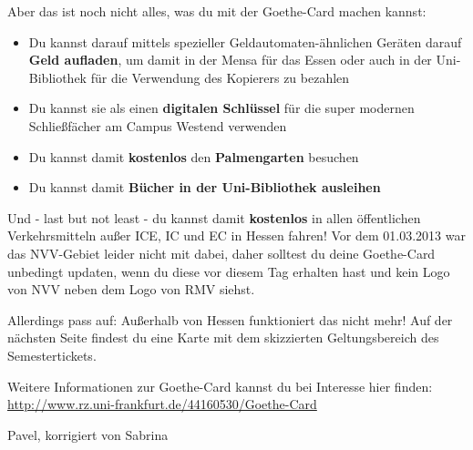 Aber das ist noch nicht alles, was du mit der Goethe-Card machen kannst:

\begin{itemize}
	\item Du kannst darauf mittels spezieller Geldautomaten-ähnlichen Geräten darauf \textbf{Geld aufladen}, um damit in der Mensa für das Essen oder auch in der Uni-Bibliothek für die Verwendung des Kopierers zu bezahlen
	\item Du kannst sie als einen \textbf{digitalen Schlüssel} für die super modernen Schließfächer am Campus Westend verwenden
	\item Du kannst damit \textbf{kostenlos} den \textbf{Palmengarten} besuchen
	\item Du kannst damit\textbf{ Bücher in der Uni-Bibliothek ausleihen}
\end{itemize}

Und - last but not least - du kannst damit \textbf{kostenlos} in allen öffentlichen Verkehrsmitteln außer ICE, IC und EC in Hessen fahren! Vor dem 01.03.2013 war das NVV-Gebiet leider nicht mit dabei, daher solltest du deine Goethe-Card unbedingt updaten, wenn du diese vor diesem Tag erhalten hast und kein Logo von NVV neben dem Logo von RMV siehst.

Allerdings pass auf: Außerhalb von Hessen funktioniert das nicht mehr! Auf der nächsten Seite findest du eine Karte mit dem skizzierten Geltungsbereich des Semestertickets.

Weitere Informationen zur Goethe-Card kannst du bei Interesse hier finden:\\
\url{http://www.rz.uni-frankfurt.de/44160530/Goethe-Card}
\begin{flushright}Pavel, korrigiert von Sabrina \end{flushright}